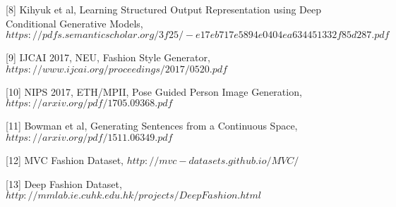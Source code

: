 \documentclass[10pt,conference]{IEEEtran}
\begin{document}
[8] Kihyuk et al, Learning Structured Output Representation using Deep Conditional Generative Models, $https://pdfs.semanticscholar.org/3f25/-e17eb717e5894e0404ea634451332f85d287.pdf$

[9] IJCAI 2017, NEU, Fashion Style Generator, $https://www.ijcai.org/proceedings/2017/0520.pdf$

[10] NIPS 2017, ETH/MPII, Pose Guided Person Image Generation, $https://arxiv.org/pdf/1705.09368.pdf$

[11] Bowman et al, Generating Sentences from a Continuous Space, $https://arxiv.org/pdf/1511.06349.pdf$

[12] MVC Fashion Dataset, $http://mvc-datasets.github.io/MVC/$

[13] Deep Fashion Dataset, $http://mmlab.ie.cuhk.edu.hk/projects/DeepFashion.html$
\end{document}
